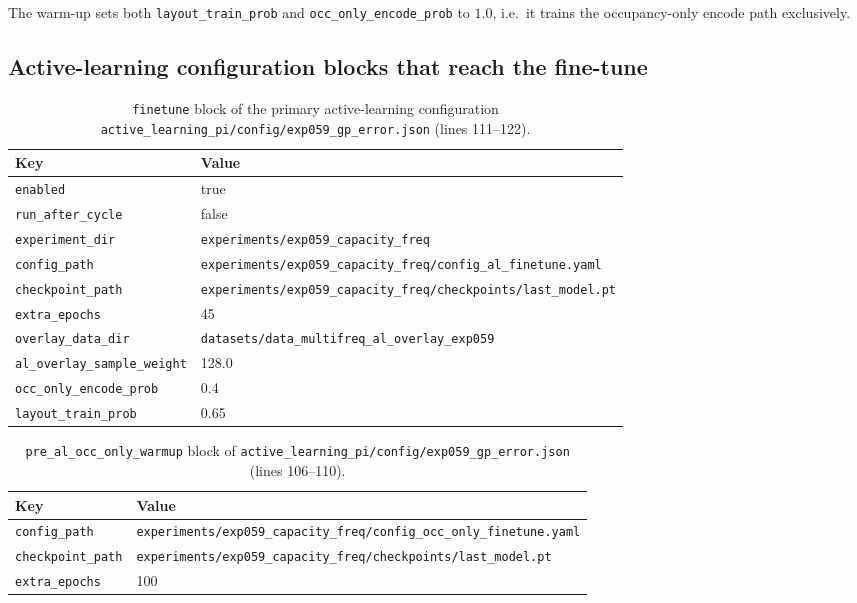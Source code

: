 The warm-up sets both \texttt{layout\_train\_prob} and \texttt{occ\_only\_encode\_prob}
to $1.0$, i.e.\ it trains the occupancy-only encode path exclusively.

\subsection{Active-learning configuration blocks that reach the fine-tune}
\label{subsec:appb_al_blocks}

\begin{table}[htbp]
\centering
\small
\caption{\texttt{finetune} block of the primary active-learning configuration
\texttt{active\_learning\_pi/config/exp059\_gp\_error.json} (lines 111--122).}
\label{tab:appb_al_finetune_block}
\begin{tabular}{@{}lp{}@{}}
\hline
Key & Value \\
\hline
\texttt{enabled} & true \\
\texttt{run\_after\_cycle} & false \\
\texttt{experiment\_dir} & \texttt{experiments/\allowbreak exp059\_capacity\_freq} \\
\texttt{config\_path} & \texttt{experiments/\allowbreak exp059\_capacity\_freq/\allowbreak config\_al\_finetune.yaml} \\
\texttt{checkpoint\_path} & \texttt{experiments/\allowbreak exp059\_capacity\_freq/\allowbreak checkpoints/\allowbreak last\_model.pt} \\
\texttt{extra\_epochs} & 45 \\
\texttt{overlay\_data\_dir} & \texttt{datasets/\allowbreak data\_multifreq\_\allowbreak al\_overlay\_exp059} \\
\texttt{al\_overlay\_sample\_weight} & 128.0 \\
\texttt{occ\_only\_encode\_prob} & 0.4 \\
\texttt{layout\_train\_prob} & 0.65 \\
\hline
\end{tabular}
\end{table}

\begin{table}[htbp]
\centering
\caption{\texttt{pre\_al\_occ\_only\_warmup} block of
\texttt{active\_learning\_pi/config/exp059\_gp\_error.json} (lines 106--110).}
\label{tab:appb_al_warmup_block}
\begin{tabular}{@{}lp{}@{}}
\hline
Key & Value \\
\hline
\texttt{config\_path} & \texttt{experiments/\allowbreak exp059\_capacity\_freq/\allowbreak config\_occ\_only\_finetune.yaml} \\
\texttt{checkpoint\_path} & \texttt{experiments/\allowbreak exp059\_capacity\_freq/\allowbreak checkpoints/\allowbreak last\_model.pt} \\
\texttt{extra\_epochs} & 100 \\
\hline
\end{tabular}
\end{table}

